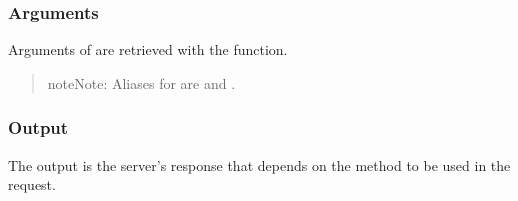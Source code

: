 \documentclass[a4paper,12pt,english]{sphinxhowto}
\begin{document}


\subsubsection{Arguments}
\label{\detokenize{Sciencedata_dk:arguments}}
Arguments of  are retrieved with the  function.

\begin{sphinxVerbatim}[commandchars=\\\{\},formatcom=\footnotesize]
 
\end{sphinxVerbatim}

\begin{quote}

\begin{sphinxadmonition}{note}{Note:}
Aliases for  are  and .
\end{sphinxadmonition}
\end{quote}



\subsubsection{Output}
\label{\detokenize{Sciencedata_dk:output}}
The output is the server’s response that depends on the method to be used in the request.
\end{document}
